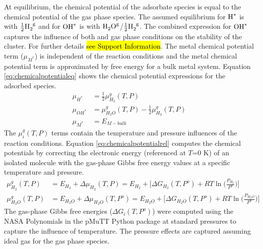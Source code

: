 \documentclass[journal=jctcce,manuscript=article]{achemso}
\begin{document}
At equilibrium, the chemical potential of the adsorbate species is equal to the chemical potential of the gas phase species. The assumed equilibrium for $\ce{H^{*}}$ is with $\frac{1}{2}\ce{H_{2}^{g}}$ and for $\ce{OH^{*}}$ is with $\ce{H_{2}O^{g}}$/$\frac{1}{2}\ce{H_{2}^{g}}$. The combined expression for $\ce{OH^{*}}$ captures the influence of both  and  gas phase conditions on the stability of the cluster. For further details \hl{see Support Information}. The metal chemical potential term ($\mu_{M^{*}}$) is independent of the reaction conditions and the metal chemical potential term is approximated by free energy for a bulk metal system. Equation \ref{eq:chemicalpotentialeq} shows the chemical potential expressions for the adsorbed species. \begin{equation}
    \begin{split}
        \mu_{H^{*}} &= \frac{1}{2} \mu_{H_{2}}^{g}(T,P) \\ 
        \mu_{OH^{*}} &= \mu_{H_{2}O}^{g}(T,P) - \frac{1}{2} \mu_{H_{2}}^{g}(T,P) \\
        \mu_{M^{*}} &= E_{M-bulk}
    \end{split}
    \label{eq:chemicalpotentialeq}
\end{equation}
The $\mu_{i}^{g}(T,P)$ terms contain the temperature and pressure influences of the reaction conditions. Equation \ref{eq:chemicalpotentialrel} computes the chemical potentials by correcting the electronic energy (referenced at $T$=0 K) of an isolated molecule with the gas-phase Gibbs free energy values at a specific temperature and pressure.
\begin{equation}
    \begin{split}
        \mu_{H_{2}}^{g}(T,P) &= E_{H_2} + \Delta \mu_{H_{2}}(T,P)  = E_{H_{2}} + \Big[ \Delta G_{H_{2}}(T,P^{o}) + RT \ln{\Big( \frac{P_{H_{2}}}{P^{o}} \Big)} \Big] \\  
        \mu_{H_{2}O}^{g}(T,P) &= E_{H_{2}O} + \Delta \mu_{H_{2}O}(T,P^{o}) =  E_{H_{2}O} + \Big[ \Delta G_{H_{2}O}(T,P^{o}) + RT \ln{\Big( \frac{P_{H_{2}O}}{P^{o}} \Big)} \Big]
    \end{split}
    \label{eq:chemicalpotentialrel}
\end{equation}
 The gas-phase Gibbs free energies ($\Delta G_{i}(T,P^{o})$) were computed using the NASA Polynomials\cite{Mcbride1993} in the pMuTT\cite{LYM2019106864} Python package at standard pressures to capture the influence of temperature. The pressure effects are captured assuming ideal gas for the gas phase species. 
\end{document}
